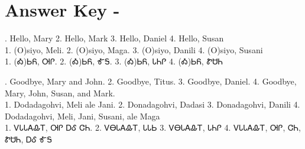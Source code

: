 \section{Answer Key -}
. Hello, Mary 2. Hello, Mark 3. Hello, Daniel 4. Hello, Susan\\
1. (O)siyo, Meli. 2. (O)siyo, Maga. 3. (O)siyo, Danili 4. (O)siyo, Susani\\
1. (Ꭳ)ᏏᏲ, ᎺᎵ. 2. (Ꭳ)ᏏᏲ, ᎹᎦ. 3. (Ꭳ)ᏏᏲ, ᏓᏂᎵ 4. (Ꭳ)ᏏᏲ, ᏑᏌᏂ 


. Goodbye, Mary and John. 2. Goodbye, Titus. 3. Goodbye, Daniel. 4. Goodbye, Mary, John, Susan, and Mark.\\
1. Dodadagohvi, Meli ale Jani. 2. Donadagohvi, Dadasi 3. Donadagohvi, Danili 4. Dodadagohvi, Meli, Jani, Susani, ale Maga\\
1. ᏙᏓᏓᎪᎲᎢ, ᎺᎵ ᎠᎴ ᏣᏂ. 2. ᏙᎾᏓᎪᎲᎢ, ᏓᏓᏏ 3. ᏙᎾᏓᎪᎲᎢ, ᏓᏂᎵ 4. ᏙᏓᏓᎪᎲᎢ, ᎺᎵ, ᏣᏂ, ᏑᏌᏂ, ᎠᎴ ᎹᎦ 


